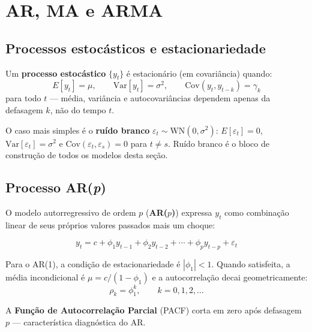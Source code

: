 \chapter{AR, MA e ARMA}
\label{cap:arma}

\section{Processos estocásticos e estacionariedade}

Um \textbf{processo estocástico} $\{y_t\}$ é estacionário (em covariância)
quando:
\[
  E[y_t] = \mu, \qquad
  \mathrm{Var}[y_t] = \sigma^2, \qquad
  \mathrm{Cov}(y_t, y_{t-k}) = \gamma_k
\]
para todo $t$ — média, variância e autocovariâncias dependem apenas da
defasagem $k$, não do tempo $t$.

O caso mais simples é o \textbf{ruído branco} $\varepsilon_t \sim
\mathrm{WN}(0, \sigma^2)$: $E[\varepsilon_t] = 0$, $\mathrm{Var}[\varepsilon_t]
= \sigma^2$ e $\mathrm{Cov}(\varepsilon_t, \varepsilon_s) = 0$ para $t \neq
s$. Ruído branco é o bloco de construção de todos os modelos desta seção.

\section{Processo AR(\textit{p})}

O modelo autorregressivo de ordem $p$ (\textbf{AR($p$)}) expressa $y_t$
como combinação linear de seus próprios valores passados mais um choque:

\[
  y_t = c + \phi_1 y_{t-1} + \phi_2 y_{t-2} + \cdots + \phi_p y_{t-p}
        + \varepsilon_t
\]

Para o AR(1), a condição de estacionariedade é $|\phi_1| < 1$. Quando
satisfeita, a média incondicional é $\mu = c / (1 - \phi_1)$ e a
autocorrelação decai geometricamente:
\[
  \rho_k = \phi_1^k, \qquad k = 0, 1, 2, \ldots
\]

A \textbf{Função de Autocorrelação Parcial} (PACF) corta em zero após
defasagem $p$ — característica diagnóstica do AR.

